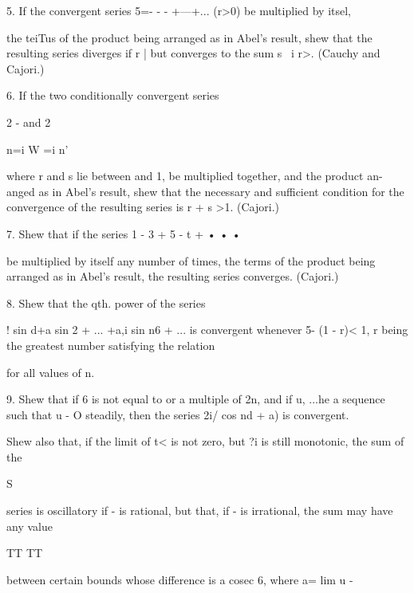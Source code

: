 5. If the convergent series 5=- - - +---+... (r>0) be multiplied by
itsel,

the teiTus of the product being arranged as in Abel's result, shew
that the resulting series diverges if r | but converges to the sum s \
i r>. (Cauchy and Cajori.)

%
%

6. If the two conditionally convergent series

2 - and 2

n=i W =i n'

where r and s lie between and 1, be multiplied together, and the
product an-anged as in Abel's result, shew that the necessary and
sufficient condition for the convergence of the resulting series is r
+ s >1. (Cajori.)

7. Shew that if the series 1 - 3 + 5 - t + • • •

be multiplied by itself any number of times, the terms of the product
being arranged as in Abel's result, the resulting series converges.
(Cajori.)

8. Shew that the qth. power of the series

 ! sin d+a sin 2 + ... +a,i sin n6 + ... is convergent whenever 5- (1
- r)< 1, r being the greatest number satisfying the relation

for all values of n.

9. Shew that if 6 is not equal to or a multiple of 2n, and if %
u, ...he a sequence such that u - O steadily, then the series 2i/ cos
nd + a) is convergent.

Shew also that, if the limit of t< is not zero, but ?i is still
monotonic, the sum of the

S

series is oscillatory if - is rational, but that, if - is irrational,
the sum may have any value

TT TT

between certain bounds whose difference is a cosec 6, where a= lim u -


